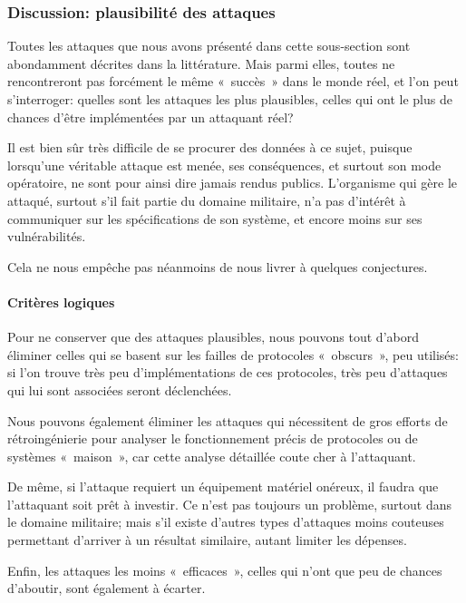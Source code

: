     \subsubsection{Discussion: plausibilité des attaques}
Toutes les attaques que nous avons présenté dans cette sous-section sont abondamment décrites dans la littérature.
Mais parmi elles, toutes ne rencontreront pas forcément le même « succès » dans le monde réel, et l'on peut s'interroger: quelles sont les attaques les plus plausibles, \cad celles qui ont le plus de chances d'être implémentées par un attaquant réel?

Il est bien sûr très difficile de se procurer des données à ce sujet, puisque lorsqu'une véritable attaque est menée, ses conséquences, et surtout son mode opératoire, ne sont pour ainsi dire jamais rendus publics.
L'organisme qui gère le \rc attaqué, surtout s'il fait partie du domaine militaire, n'a pas d'intérêt à communiquer sur les spécifications de son système, et encore moins sur ses vulnérabilités.

Cela ne nous empêche pas néanmoins de nous livrer à quelques conjectures.

        \paragraph{Critères logiques}
Pour ne conserver que des attaques plausibles, nous pouvons tout d'abord éliminer celles qui se basent sur les failles de protocoles « obscurs », peu utilisés: si l'on trouve très peu d'implémentations de ces protocoles, très peu d'attaques qui lui sont associées seront déclenchées.

Nous pouvons également éliminer les attaques qui nécessitent de gros efforts de rétroingénierie pour analyser le fonctionnement précis de protocoles ou de systèmes « maison », car cette analyse détaillée coute cher à l'attaquant.

De même, si l'attaque requiert un équipement matériel onéreux, il faudra que l'attaquant soit prêt à investir.
Ce n'est pas toujours un problème, surtout dans le domaine militaire; mais s'il existe d'autres types d'attaques moins couteuses permettant d'arriver à un résultat similaire, autant limiter les dépenses.

Enfin, les attaques les moins « efficaces », celles qui n'ont que peu de chances d'aboutir, sont également à écarter.

